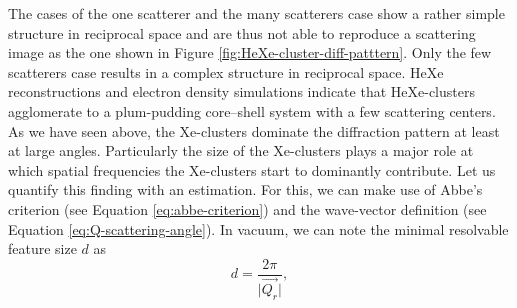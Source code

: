 %
The cases of the one scatterer and the many scatterers case show a rather simple structure in reciprocal space and are thus not able to reproduce a scattering image as the one shown in Figure \ref{fig:HeXe-cluster-diff-patttern}. Only the few scatterers case results in a complex structure in reciprocal space. HeXe reconstructions and electron density simulations indicate that HeXe-clusters agglomerate to a plum-pudding core--shell system with a few scattering centers.\\[1\baselineskip]
%
%
As we have seen above, the Xe-clusters dominate the diffraction pattern at least at large angles. Particularly the size of the Xe-clusters plays a major role at which spatial frequencies the Xe-clusters start to dominantly contribute. Let us quantify this finding with an estimation.
For this, we can make use of Abbe's criterion (see Equation \eqref{eq:abbe-criterion}) and the wave-vector definition (see Equation \eqref{eq:Q-scattering-angle}). In vacuum, we can note the minimal resolvable feature size $d$ as
\begin{equation}
d = \frac{2\pi}{\lvert\vec{Q_{r}}\rvert},
\label{eq:diameter-estimate}
\end{equation}
